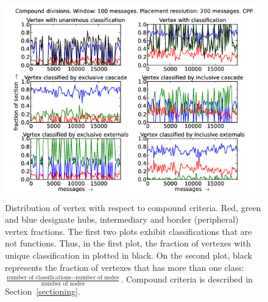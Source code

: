 \documentclass[%
 aip,
 jmp,%
 amsmath,amssymb,
 reprint,%
]{revtex4-1}
\begin{document}
\begin{figure}[hbtp] 
   \centering
        \includegraphics[width=\textwidth]{figs/CPP/100_2}
    \caption{Distribution of vertex with respect to compound criteria. Red, green and blue designate hubs, intermediary and border (peripheral) vertex fractions. The first two plots exhibit classifications that are not functions. Thus, in the first plot, the fraction of vertexes with unique classification in plotted in black. On the second plot, black represents the fraction of vertexes that has more than one class: $\frac{\text{number of classifications} - \text{number of nodes}}{\text{number of nodes}}$. Compound criteria is described in Section~\ref{sectioning}.}
    \label{fig:cpp100_}
\end{figure}
\end{document}
